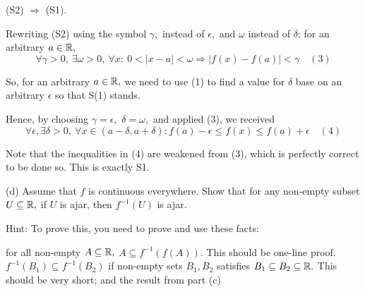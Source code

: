 \documentclass{article}
\begin{document}
\begin{soln}
    \begin{claim*}
        (S2) $\Rightarrow$ (S1).
    \end{claim*}
    \begin{subproof}
        
        Rewriting (S2) using the symbol $\gamma,$ instead of $\epsilon,$ and $\omega$ instead of $\delta$: for an arbitrary $a \in \mathbb R,$
        \[
            \forall \gamma > 0,\ \exists \omega > 0,\ \forall x:\  0 < |x-a| < \omega \Rightarrow |f(x)-f(a)| < \gamma \quad (3)
        \]
    
        So, for an arbitrary $a \in \mathbb R,$ we need to use (1) to find a value for $\delta$ base on an arbitrary $\epsilon$ so that S(1) stands.
        
        Hence, by choosing  $\gamma = \epsilon,$ $\delta = \omega,$ and applied (3), we received
        \[
            \forall \epsilon, \exists \delta > 0,\ \forall x \in (a-\delta, a+\delta): f(a) - \epsilon \le f(x) \le f(a) + \epsilon \quad (4)
        \]

        Note that the inequalities in (4) are weakened from (3), which is perfectly correct to be done so. This is exactly S1.
    \end{subproof}
\end{soln}

\newpage

\begin{problem*}[Problem 4d]
    (d) Assume  that $f$ is continuous everywhere. Show that for any non-empty subset $U \subseteq \mathbb R,$ 
    if $U$ is ajar, then $f^{-1}(U)$ is ajar. 

    Hint: To prove this, you need to prove and use these facts:
    \begin{enumerate}[topsep=0pt, partopsep=0pt, itemsep=0pt]
        \ii for all non-empty $A \subseteq \mathbb R,$ $A \subseteq f^{-1}(f(A)).$ This should be one-line proof. 
        \ii $f^{-1}(B_1) \subseteq f^{-1} (B_2)$ if non-empty sets $B_1, B_2$ satisfies $B_1 \subseteq B_2 \subseteq \mathbb R.$ This should be very short; and
        \ii the result from part (c)
    \end{enumerate}
\end{problem*}
\end{document}
